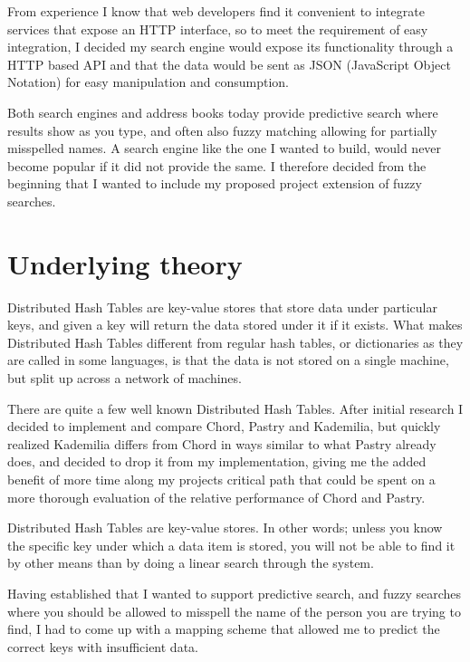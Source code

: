 From experience I know that web developers find it convenient to integrate services that expose an HTTP interface, so to meet the requirement of easy integration, I decided my search engine would expose its functionality through a HTTP based API and that the data would be sent as JSON (JavaScript Object Notation) for easy manipulation and consumption.

Both search engines and address books today provide predictive search where results show as you type, and often also fuzzy matching allowing for partially misspelled names. A search engine like the one I wanted to build, would never become popular if it did not provide the same. I therefore decided from the beginning that I wanted to include my proposed project extension of fuzzy searches.

\section{Underlying theory}
Distributed Hash Tables are key-value stores that store data under particular keys, and given a key will return the data stored under it if it exists.
What makes Distributed Hash Tables different from regular hash tables, or dictionaries as they are called in some languages, is that the data is not stored on a single machine, but split up across a network of machines.

There are quite a few well known Distributed Hash Tables. After initial research I decided to implement and compare Chord, Pastry and Kademilia, but quickly realized Kademilia differs from Chord in ways similar to what Pastry already does, and decided to drop it from my implementation, giving me the added benefit of more time along my projects critical path that could be spent on a more thorough evaluation of the relative performance of Chord and Pastry.

\mbox{}

Distributed Hash Tables are key-value stores. In other words; unless you know the specific key under which a data item is stored, you will not be able to find it by other means than by doing a linear search through the system.

Having established that I wanted to support predictive search, and fuzzy searches where you should be allowed to misspell the name of the person you are trying to find, I had to come up with a mapping scheme that allowed me to predict the correct keys with insufficient data.

